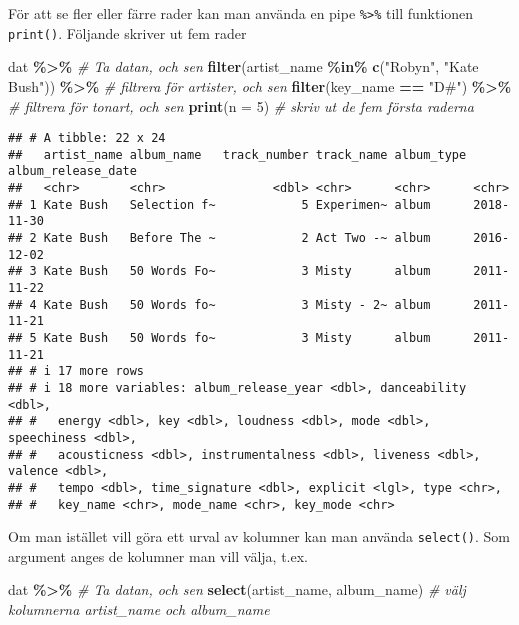 \documentclass[
]{book}
\newenvironment{Shaded}{\begin{snugshade}}{\end{snugshade}}
\newcommand{\AttributeTok}[1]{\textcolor[rgb]{0.13,0.29,0.53}{#1}}
\newcommand{\CommentTok}[1]{\textcolor[rgb]{0.56,0.35,0.01}{\textit{#1}}}
\newcommand{\DecValTok}[1]{\textcolor[rgb]{0.00,0.00,0.81}{#1}}
\newcommand{\FunctionTok}[1]{\textcolor[rgb]{0.13,0.29,0.53}{\textbf{#1}}}
\newcommand{\NormalTok}[1]{#1}
\newcommand{\SpecialCharTok}[1]{\textcolor[rgb]{0.81,0.36,0.00}{\textbf{#1}}}
\newcommand{\StringTok}[1]{\textcolor[rgb]{0.31,0.60,0.02}{#1}}
\theoremstyle{definition}
\theoremstyle{definition}
\theoremstyle{definition}
\theoremstyle{definition}
\theoremstyle{remark}
\begin{document}
För att se fler eller färre rader kan man använda en pipe \texttt{\%\textgreater{}\%} till funktionen \texttt{print()}. Följande skriver ut fem rader

\begin{Shaded}
\begin{Highlighting}[]
\NormalTok{dat }\SpecialCharTok{\%\textgreater{}\%}                                                     \CommentTok{\# Ta datan, och sen}
  \FunctionTok{filter}\NormalTok{(artist\_name }\SpecialCharTok{\%in\%} \FunctionTok{c}\NormalTok{(}\StringTok{"Robyn"}\NormalTok{, }\StringTok{"Kate Bush"}\NormalTok{)) }\SpecialCharTok{\%\textgreater{}\%}      \CommentTok{\# filtrera för artister, och sen}
  \FunctionTok{filter}\NormalTok{(key\_name }\SpecialCharTok{==} \StringTok{"D\#"}\NormalTok{)  }\SpecialCharTok{\%\textgreater{}\%}                             \CommentTok{\# filtrera för tonart, och sen}
  \FunctionTok{print}\NormalTok{(}\AttributeTok{n =} \DecValTok{5}\NormalTok{)                                              }\CommentTok{\# skriv ut de fem första raderna}
\end{Highlighting}
\end{Shaded}

\begin{verbatim}
## # A tibble: 22 x 24
##   artist_name album_name   track_number track_name album_type album_release_date
##   <chr>       <chr>               <dbl> <chr>      <chr>      <chr>             
## 1 Kate Bush   Selection f~            5 Experimen~ album      2018-11-30        
## 2 Kate Bush   Before The ~            2 Act Two -~ album      2016-12-02        
## 3 Kate Bush   50 Words Fo~            3 Misty      album      2011-11-22        
## 4 Kate Bush   50 Words fo~            3 Misty - 2~ album      2011-11-21        
## 5 Kate Bush   50 Words fo~            3 Misty      album      2011-11-21        
## # i 17 more rows
## # i 18 more variables: album_release_year <dbl>, danceability <dbl>,
## #   energy <dbl>, key <dbl>, loudness <dbl>, mode <dbl>, speechiness <dbl>,
## #   acousticness <dbl>, instrumentalness <dbl>, liveness <dbl>, valence <dbl>,
## #   tempo <dbl>, time_signature <dbl>, explicit <lgl>, type <chr>,
## #   key_name <chr>, mode_name <chr>, key_mode <chr>
\end{verbatim}

Om man istället vill göra ett urval av kolumner kan man använda \texttt{select()}. Som argument anges de kolumner man vill välja, t.ex.

\begin{Shaded}
\begin{Highlighting}[]
\NormalTok{dat }\SpecialCharTok{\%\textgreater{}\%}                                \CommentTok{\# Ta datan, och sen}
  \FunctionTok{select}\NormalTok{(artist\_name, album\_name)      }\CommentTok{\# välj kolumnerna artist\_name och album\_name}
\end{Highlighting}
\end{Shaded}
\end{document}
